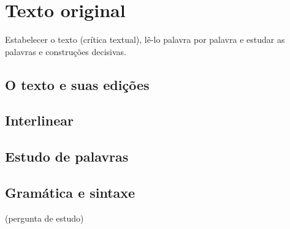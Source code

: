 \chapter{Texto original}\label{cap:original}

\begin{objetivo}
Estabelecer o texto (crítica textual), lê-lo palavra por palavra e estudar as palavras e construções decisivas.
\end{objetivo}

\section{O texto e suas edições}

\section{Interlinear}

\section{Estudo de palavras}

\section{Gramática e sintaxe}

\begin{pergunta}
(pergunta de estudo)
\end{pergunta}
